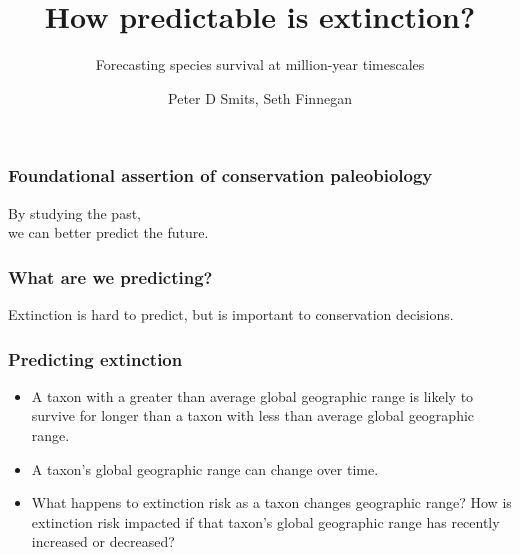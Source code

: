 \documentclass{beamer}
\title{How predictable is extinction?}
\subtitle{Forecasting species survival at million-year timescales}
\author{Peter D Smits, Seth Finnegan}
\institute{Department of Integrative Biology, University of California -- Berkeley}
\date{}
\begin{document}
\begin{frame}
  \maketitle
\end{frame}


\begin{frame}
  \frametitle{Foundational assertion of conservation paleobiology }

  \begin{center}
    \begin{LARGE}
      By studying the \alert{past}, \\we can better predict the \alert{future}.
    \end{LARGE}
  \end{center}

\end{frame}


\begin{frame}
  \frametitle{What are we predicting?}

  \begin{center}
    \begin{LARGE}
      Extinction is \alert{hard} to predict, but is \alert{important} to conservation decisions.
    \end{LARGE}
  \end{center}

\end{frame}


\begin{frame}
  \frametitle{Predicting extinction}

  \begin{itemize}[<+->]
    \item A taxon with a \alert{greater than average} global geographic range is likely to \alert{survive for longer} than a taxon with \alert{less than average} global geographic range.
    \item A taxon's global geographic range can change over time.
    \item What happens to extinction risk as a taxon changes geographic range? How is extinction risk impacted if that taxon's global geographic range has recently \alert{increased} or \alert{decreased}?
  \end{itemize}

\end{frame}
\end{document}
